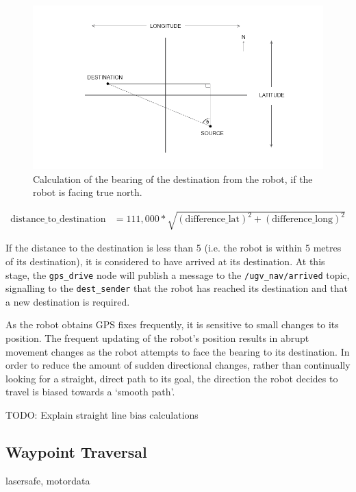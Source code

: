 \documentclass[titlepage,12pt,a4paper]{article}
\begin{document}
\begin{figure}[h]
	\centering
	\includegraphics[scale=1]{bearings.png}
	\caption{Calculation of the bearing of the destination from the robot, if the robot is facing true north.}
\end{figure}


\begin{align*}
	\text{distance\_to\_destination}	&= 	111,000 * \sqrt{(\text{difference\_lat})^2 + (\text{difference\_long})^2}
\end{align*}

If the distance to the destination is less than 5 (i.e. the robot is within 5 metres of its destination), it is considered to have arrived at its destination. At this stage, the \verb|gps_drive| node will publish a message to the \verb|/ugv_nav/arrived| topic, signalling to the \verb|dest_sender| that the robot has reached its destination and that a new destination is required.

As the robot obtains GPS fixes frequently, it is sensitive to small changes to its position. The frequent updating of the robot's position results in abrupt movement changes as the robot attempts to face the bearing to its destination. In order to reduce the amount of sudden directional changes, rather than continually looking for a straight, direct path to its goal, the direction the robot decides to travel is biased towards a `smooth path'.

TODO: Explain straight line bias calculations 

\subsection{Waypoint Traversal}
lasersafe, motordata
\end{document}
